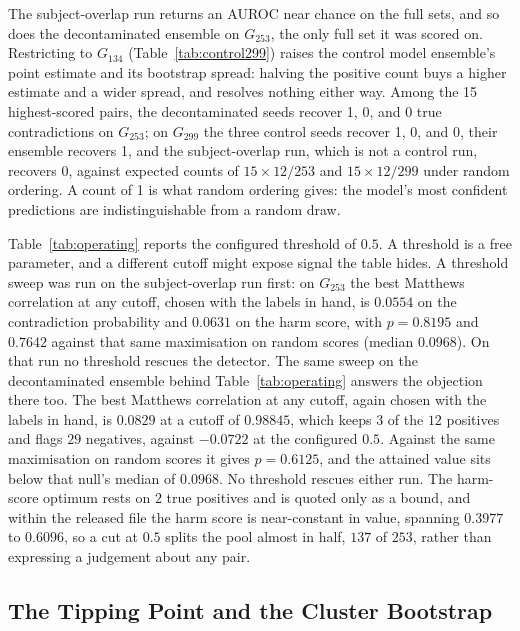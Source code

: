 The subject-overlap run returns an AUROC near chance on the full sets,
and so does the decontaminated ensemble on $G_{253}$, the only full set it was
scored on. Restricting to $G_{134}$ (Table~\ref{tab:control299}) raises the
control model ensemble's point estimate and its bootstrap spread: halving the
positive count buys a higher estimate and a wider spread, and resolves nothing
either way. Among the 15 highest-scored pairs, the decontaminated seeds recover 1, 0, and
0 true contradictions on $G_{253}$; on $G_{299}$ the three control seeds
recover 1, 0, and 0, their ensemble recovers 1, and the subject-overlap run,
which is not a control run, recovers 0, against expected counts of
$15 \times 12/253$ and $15 \times 12/299$ under random ordering. A count of 1 is what random ordering gives: the model's most confident predictions
are indistinguishable from a random draw.

Table~\ref{tab:operating} reports the configured threshold of $0.5$. A
threshold is a free parameter, and a different cutoff might expose signal the
table hides. A threshold sweep was run on the subject-overlap run first:
on $G_{253}$ the best Matthews correlation at any cutoff, chosen with the labels
in hand, is $0.0554$ on the contradiction probability and $0.0631$ on the harm
score, with $p = 0.8195$ and $0.7642$ against that same maximisation on
random scores (median $0.0968$). On that run no threshold rescues the
detector. The same sweep on the decontaminated ensemble behind
Table~\ref{tab:operating} answers the objection there too. The best Matthews
correlation at any cutoff, again chosen with the labels in hand, is $0.0829$ at a
cutoff of $0.98845$, which keeps $3$ of the $12$ positives and flags $29$
negatives, against $-0.0722$ at the configured $0.5$. Against the same
maximisation on random scores it gives $p = 0.6125$, and the attained value sits
below that null's median of $0.0968$. No threshold rescues either run.
The harm-score optimum rests on $2$ true positives and is quoted only as a bound,
and within the released file the harm score is near-constant in value, spanning
$0.3977$ to $0.6096$, so a cut at $0.5$ splits the pool almost in half, $137$ of
$253$, rather than expressing a judgement about any pair.

\subsection{The Tipping Point and the Cluster Bootstrap}

